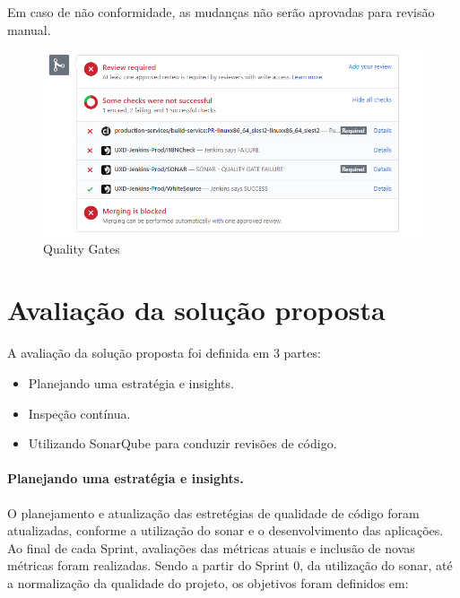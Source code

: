\documentclass[12pt]{article}
\begin{document}
Em caso de não conformidade, as mudanças não serão aprovadas para revisão manual.
\begin{figure}[H]
	\centering
		\includegraphics[scale=0.5]{img/sonar-check-quality-gate-fail.png}
	\caption{Quality Gates}
	\label{fig:sonar-quality-gates}
\end{figure}



\part{Avaliação da solução proposta} \label{sec:avaliacao}
 A avaliação da solução proposta foi definida em 3 partes:

 \begin{itemize}
 	\item Planejando uma estratégia e insights.
 	\item Inspeção contínua.
 	\item Utilizando SonarQube para conduzir revisões de código.
 \end{itemize}

\subsection{Planejando uma estratégia e insights.} \label{sec:sonar-planning}

O planejamento e atualização das estretégias de qualidade de código foram atualizadas, conforme a utilização do sonar e o desenvolvimento das aplicações.
Ao final de cada Sprint, avaliações das métricas atuais e inclusão de novas métricas foram realizadas.
Sendo a partir do Sprint 0, da utilização do sonar, até a normalização da qualidade do projeto, os objetivos foram definidos em:
\end{document}

